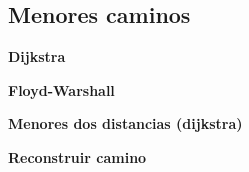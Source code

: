 \subsection{Menores caminos}
    \textbf{Dijkstra}
    

    \textbf{Floyd-Warshall}
    

    \textbf{Menores dos distancias (dijkstra)}
    

    \textbf{Reconstruir camino}
    